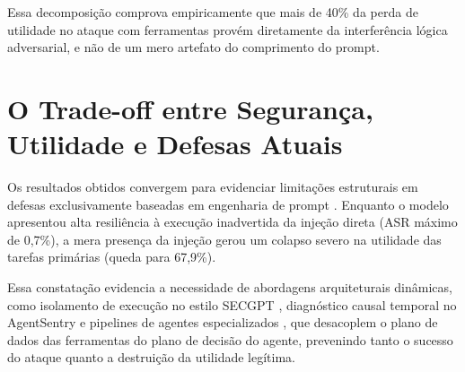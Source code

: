 Essa decomposição comprova empiricamente que mais de 40\% da perda de utilidade no ataque com ferramentas provém diretamente da interferência lógica adversarial, e não de um mero artefato do comprimento do prompt.

\section{O Trade-off entre Segurança, Utilidade e Defesas Atuais}

Os resultados obtidos convergem para evidenciar limitações estruturais em defesas exclusivamente baseadas em engenharia de prompt \cite{wang2026landscapepromptinjectionthreats,wallace2024instructionhierarchytrainingllms}. Enquanto o modelo apresentou alta resiliência à execução inadvertida da injeção direta (ASR máximo de 0,7\%), a mera presença da injeção gerou um colapso severo na utilidade das tarefas primárias (queda para 67,9\%).

Essa constatação evidencia a necessidade de abordagens arquiteturais dinâmicas, como isolamento de execução no estilo SECGPT \cite{wu2023secgpt}, diagnóstico causal temporal no AgentSentry \cite{zhang2026agentsentrymitigatingindirectprompt} e pipelines de agentes especializados \cite{hossain2025multiagentllmdefensepipeline}, que desacoplem o plano de dados das ferramentas do plano de decisão do agente, prevenindo tanto o sucesso do ataque quanto a destruição da utilidade legítima.
